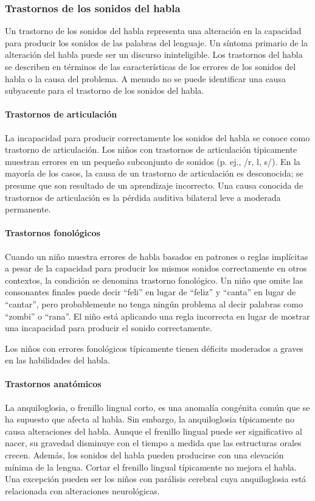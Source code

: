 \documentclass[11pt,letterpaper]{report}
\begin{document}
\subsubsection{Trastornos de los sonidos del habla}
Un trastorno de los sonidos del habla representa una alteración en la
capacidad para producir los sonidos de las palabras del lenguaje. Un síntoma
primario de la alteración del habla puede ser un discurso ininteligible. Los
trastornos del habla se describen en términos de las características de los
errores de los sonidos del habla o la causa del problema. A menudo no se puede
identificar una causa subyacente para el trastorno de los sonidos del habla.
\cite{Feldman44}

\paragraph{Trastornos de articulación}
La incapacidad para producir correctamente los sonidos del habla se conoce
como trastorno de articulación. Los niños con trastornos de articulación
típicamente muestran errores en un pequeño subconjunto de sonidos
(p. ej., /r, l, s/). En la mayoría de los casos, la causa de un trastorno de
articulación es desconocida; se presume que son resultado de un aprendizaje
incorrecto. Una causa conocida de trastornos de articulación es la pérdida
auditiva bilateral leve a moderada permanente. \cite{Feldman44}

\paragraph{Trastornos fonológicos}
Cuando un niño muestra errores de habla basados en patrones o reglas
implícitas a pesar de la capacidad para producir los mismos sonidos
correctamente en otros contextos, la condición se denomina trastorno
fonológico. Un niño que omite las consonantes finales puede decir ``feli'' en
lugar de ``feliz'' y ``canta'' en lugar de ``cantar'', pero probablemente no
tenga ningún problema al decir palabras como ``zombi'' o ``rana''. El niño está
aplicando una regla incorrecta en lugar de mostrar una incapacidad para
producir el sonido correctamente. \cite{Feldman44}

Los niños con errores fonológicos típicamente tienen déficits moderados a
graves en las habilidades del habla.

\paragraph{Trastornos anatómicos}
La anquiloglosia, o frenillo lingual corto, es una anomalía congénita común
que se ha supuesto que afecta al habla. Sin embargo, la anquiloglosia
típicamente no causa alteraciones del habla. Aunque el frenillo lingual puede
ser significativo al nacer, su gravedad disminuye con el tiempo a medida que
las estructuras orales crecen. Además, los sonidos del habla pueden producirse
con una elevación mínima de la lengua. Cortar el frenillo lingual
típicamente no mejora el habla. Una excepción pueden ser los niños con
parálisis cerebral cuya anquiloglosia está relacionada con alteraciones
neurológicas. \cite{Feldman44}
\end{document}
